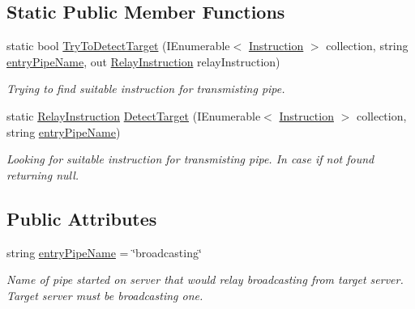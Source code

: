 \subsection*{Static Public Member Functions}
\begin{DoxyCompactItemize}
\item 
static bool \mbox{\hyperlink{class_pipes_provider_1_1_networking_1_1_routing_1_1_relay_instruction_a31f5ae59274888144f030d36e6b0a048}{Try\+To\+Detect\+Target}} (I\+Enumerable$<$ \mbox{\hyperlink{class_pipes_provider_1_1_networking_1_1_routing_1_1_instruction}{Instruction}} $>$ collection, string \mbox{\hyperlink{class_pipes_provider_1_1_networking_1_1_routing_1_1_relay_instruction_ab5f83b58775b783a3dc4d4ad2d9ffb81}{entry\+Pipe\+Name}}, out \mbox{\hyperlink{class_pipes_provider_1_1_networking_1_1_routing_1_1_relay_instruction}{Relay\+Instruction}} relay\+Instruction)
\begin{DoxyCompactList}\small\item\em Trying to find suitable instruction for transmisting pipe. \end{DoxyCompactList}\item 
static \mbox{\hyperlink{class_pipes_provider_1_1_networking_1_1_routing_1_1_relay_instruction}{Relay\+Instruction}} \mbox{\hyperlink{class_pipes_provider_1_1_networking_1_1_routing_1_1_relay_instruction_a94279d5a766e562f152ce612827fcbe8}{Detect\+Target}} (I\+Enumerable$<$ \mbox{\hyperlink{class_pipes_provider_1_1_networking_1_1_routing_1_1_instruction}{Instruction}} $>$ collection, string \mbox{\hyperlink{class_pipes_provider_1_1_networking_1_1_routing_1_1_relay_instruction_ab5f83b58775b783a3dc4d4ad2d9ffb81}{entry\+Pipe\+Name}})
\begin{DoxyCompactList}\small\item\em Looking for suitable instruction for transmisting pipe. In case if not found returning null. \end{DoxyCompactList}\end{DoxyCompactItemize}
\subsection*{Public Attributes}
\begin{DoxyCompactItemize}
\item 
string \mbox{\hyperlink{class_pipes_provider_1_1_networking_1_1_routing_1_1_relay_instruction_ab5f83b58775b783a3dc4d4ad2d9ffb81}{entry\+Pipe\+Name}} = \char`\"{}broadcasting\char`\"{}
\begin{DoxyCompactList}\small\item\em Name of pipe started on server that would relay broadcasting from target server. Target server must be broadcasting one. \end{DoxyCompactList}\end{DoxyCompactItemize}
